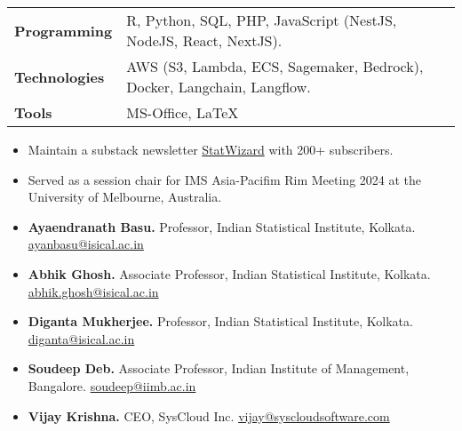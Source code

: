 \documentclass[10pt]{developercv} %
\begin{document}
\vspace{-6pt}

\begin{tabular}{p{3cm}l}
    \textbf{Programming} & R, Python, SQL, PHP, JavaScript (NestJS, NodeJS, React, NextJS).\\
    \textbf{Technologies} & AWS (S3, Lambda, ECS, Sagemaker, Bedrock), Docker, Langchain, Langflow.\\
    \textbf{Tools} & MS-Office, \LaTeX\\
\end{tabular}


\vspace{-6pt}
\begin{itemize}[noitemsep]
    \item Maintain a substack newsletter \href{https://statwizard.substack.com/?showWelcome=true}{StatWizard} with 200+ subscribers.
    \item Served as a session chair for IMS Asia-Pacifim Rim Meeting 2024 at the University of Melbourne, Australia.
\end{itemize}

\vspace{-6pt}
\vspace{-6pt}
\begin{itemize}[noitemsep]
    \item \textbf{Ayaendranath Basu.} Professor, Indian Statistical Institute, Kolkata. \href{mailto:ayanbasu@isical.ac.in}{ayanbasu@isical.ac.in}
    \item \textbf{Abhik Ghosh.}  Associate Professor, Indian Statistical Institute, Kolkata. \href{mailto:abhik.ghosh@isical.ac.in}{abhik.ghosh@isical.ac.in}
    \item \textbf{Diganta Mukherjee.} Professor, Indian Statistical Institute, Kolkata. \href{mailto:diganta@isical.ac.in}{diganta@isical.ac.in}
    \item \textbf{Soudeep Deb.} Associate Professor, Indian Institute of Management, Bangalore. \href{mailto:soudeep@iimb.ac.in}{soudeep@iimb.ac.in}
    \item \textbf{Vijay Krishna.} CEO, SysCloud Inc. \href{mailto:vijay@syscloudsoftware.com}{vijay@syscloudsoftware.com}
\end{itemize}
\end{document}
